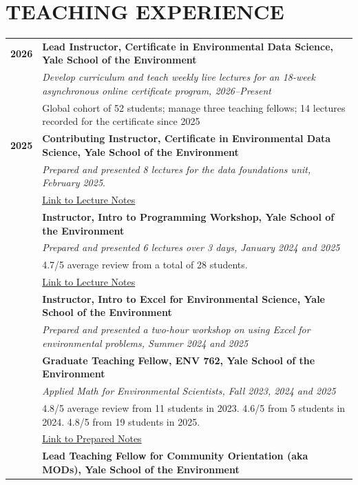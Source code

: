 \documentclass[11pt]{article}
\begin{document}
\section*{TEACHING EXPERIENCE}
\begin{longtable}{>{\bfseries}r p{5.5in}}%
2026 & \textbf{Lead Instructor, Certificate in Environmental Data Science, Yale School of the Environment} \\
    & \textit{Develop curriculum and teach weekly live lectures for an 18-week asynchronous online certificate program, 2026--Present} \\
    & Global cohort of 52 students; manage three teaching fellows; 14 lectures recorded for the certificate since 2025 \\[1ex]
2025 & \textbf{Contributing Instructor, Certificate in Environmental Data Science, Yale School of the Environment} \\
    & \textit{Prepared and presented 8 lectures for the data foundations unit, February 2025}.\\ 
    & \href{https://github.com/a5creel/yse_data_science_certificate}{Link to Lecture Notes} \\[1ex]
    & \textbf{Instructor, Intro to Programming Workshop, Yale School of the Environment} \\
    & \textit{Prepared and presented 6 lectures over 3 days, January 2024 and 2025} \\
    & 4.7/5 average review from a total of 28 students.\\
    &  \href{https://github.com/a5creel/intro_to_programming}{Link to Lecture Notes}  \\[1ex]
    & \textbf{Instructor, Intro to Excel for Environmental Science, Yale School of the Environment} \\
    & \textit{Prepared and presented a two-hour workshop on using Excel for environmental problems, Summer 2024 and 2025} \\[1ex]
    & \textbf{Graduate Teaching Fellow, ENV 762, Yale School of the Environment} \\
    & \textit{Applied Math for Environmental Scientists, Fall 2023, 2024 and 2025} \\
    & 4.8/5 average review from 11 students in 2023. 4.6/5 from 5 students in 2024. 4.8/5 from 19 students in 2025. \\
    & \href{https://github.com/a5creel/AMES}{Link to Prepared Notes} \\[1ex]    
    & \textbf{Lead Teaching Fellow for Community Orientation (aka MODs), Yale School of the Environment} \\

\end{longtable}
\end{document}

